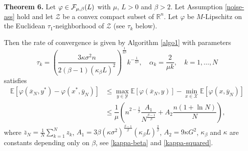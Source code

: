 \documentclass[runningheads]{llncs}
\def \R {\mathbb R}
\def\R{\mathbb{R}}
\newcommand{\E}{{\mathbb E}}
\def\R{\mathbb R}
\def\E{\mathbb E}
\begin{document}
\textbf{Theorem 6.}
Let $\varphi \in {\cal F}_{\mu, \beta}(L)$ with $\mu$, $L > 0$ and $\beta > 2$. 
Let Assumption \ref{noise-ass} hold 
and let $\mathcal{Z}$ be a convex compact subset of $\R^n$.
Let $\varphi$ be $M$-Lipschitz on the Euclidean $\tau_1$-neighborhood of $\mathcal{Z}$ (see $\tau_k$ below). 

Then the rate of convergence is given by Algorithm \ref{algo1} with parameters
\begin{equation*}
    \tau_k = \left(\dfrac{3\kappa\sigma^2n}{2(\beta-1)(\kappa_\beta L)^2}\right)^{\frac{1}{2\beta}}k^{-\frac{1}{2\beta}}, \quad \alpha_k=\dfrac{2}{\mu k}, \quad k =1,\dots, N
\end{equation*}
satisfies 
\begin{equation*}
\begin{split}
    \E \left[ \varphi(\overline{x}_N, y^*) - \varphi(x^*, \overline{y}_N) \right] &\leq \max_{y\in \mathcal{Y}} \E \left[\varphi(\overline{x}_N, y)  \right] -
    \min_{x\in \mathcal{X}}\E \left[\varphi(x, \overline{y}_N) \right] \\
    &\leq \dfrac{1}{\mu} \left(n^{2-\frac{1}{\beta}}\dfrac{A_1}{N^{\frac{\beta-1}{\beta}}}+A_2\dfrac{n(1+\ln N)}{N} \right),
\end{split}
\end{equation*}
where $\overline{z}_N = \frac{1}{N}\sum\limits_{k=1}^N z_k$, $A_1=3\beta(\kappa \sigma^2)^{\frac{\beta-1}{\beta}}(\kappa_{\beta}L)^{\frac{2}{\beta}}$, $A_2=9\kappa G^2$, $\kappa_{\beta}$ and $\kappa$ are constants depending only on $\beta$, see \eqref{kappa-beta} and \eqref{kappa-squared}.
\end{document}
